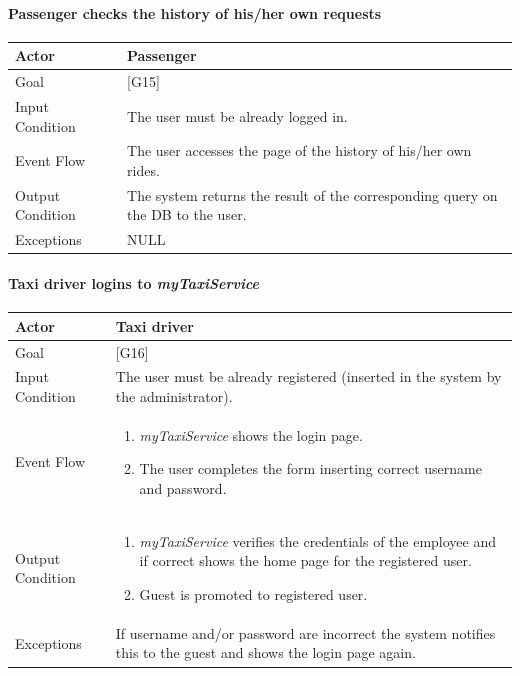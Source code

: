 \documentclass[a4paper,11pt]{report} %
\newcommand{\mts}{\mbox{\normalfont\itshape myTaxiService}}
\begin{document}
	\pagebreak
	
	\paragraph{Passenger checks the history of his/her own requests}
	\begin{center}
		\begin{tabular}{| l | p{9cm} |}\hline
			Actor & Passenger\\\hline
			Goal & {[}G15{]} \\\hline
			Input Condition & The user must be already logged in.\\\hline
			Event Flow & The user accesses the page of the history of his/her own rides.\\\hline
			Output Condition & The system returns the result of the corresponding query on the DB to the user.\\\hline
			Exceptions & NULL\\\hline
		\end{tabular}
	\end{center}	
	
	\pagebreak
	
	\paragraph{Taxi driver logins to \mts{}}
	\begin{center}
		\begin{tabular}{| l | p{9cm} |}\hline
			Actor & Taxi driver\\\hline
			Goal & {[}G16{]} \\\hline
			Input Condition & The user must be already registered (inserted in the system by the administrator).\\\hline
			Event Flow & \begin{enumerate}
				\item \mts{} shows the login page.
				\item The user completes the form inserting correct username and password.
			\end{enumerate}\\\hline
			Output Condition & \begin{enumerate}
				\item \mts{} verifies the credentials of the employee and if correct shows the home page for the registered user.
				\item Guest is promoted to registered user.
			\end{enumerate}\\\hline
			Exceptions & If username and/or password are incorrect the system notifies this to the guest and shows the login page again.\\\hline
		\end{tabular}
	\end{center}
	
\end{document}
